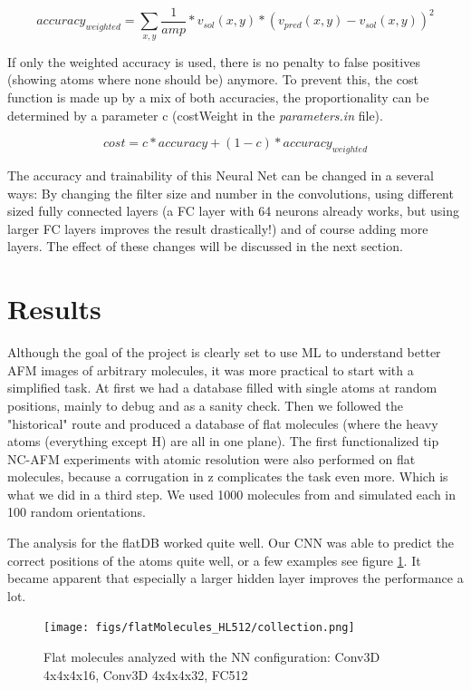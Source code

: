\documentclass{article}
\begin{document}
\begin{equation}
accuracy_{weighted} = \sum_{x, y} \frac{1}{amp}* v_{sol}(x,y)*(v_{pred}(x,y)-v_{sol}(x,y))^2
\label{eq:acc_weighted}
\end{equation}

If only the weighted accuracy is used, there is no penalty to false positives (showing atoms where none should be) anymore. To prevent this, the cost function is made up by a mix of both accuracies, the proportionality can be determined by a parameter c (costWeight in the \emph{parameters.in} file).

\begin{equation}
cost = c*accuracy + (1-c)*accuracy_{weighted}
\end{equation}

The accuracy and trainability of this Neural Net can be changed in a several ways: By changing the filter size and number in the convolutions, using different sized fully connected layers (a FC layer with 64 neurons already works, but using larger FC layers improves the result drastically!) and of course adding more layers. The effect of these changes will be discussed in the next section.


\newpage
\section{Results}

Although the goal of the project is clearly set to use ML to understand better AFM images of arbitrary molecules, it was more practical to start with a simplified task. At first we had a database filled with single atoms at random positions, mainly to debug and as a sanity check. Then we followed the "historical" route and produced a database of flat molecules (where the heavy atoms (everything except H) are all in one plane). The first functionalized tip NC-AFM experiments with atomic resolution were also performed on flat molecules, because a corrugation in z complicates the task even more. Which is what we did in a third step. We used 1000 molecules from \cite{ramakrishnan2014quantum} and simulated each in 100 random orientations.

The analysis for the flatDB worked quite well. Our CNN was able to predict the correct positions of the atoms quite well, or a few examples see figure \ref{fig:resultsflatDB}. It became apparent that especially a larger hidden layer improves the performance a lot. 

\begin{figure}[htbp]
	\begin{center}
		\texttt{[image: figs/flatMolecules\_HL512/collection.png]}

		\caption{Flat molecules analyzed with the NN configuration: Conv3D 4x4x4x16, Conv3D 4x4x4x32, FC512}
		\label{fig:resultsflatDB}
	\end{center}
\end{figure}
\end{document}
